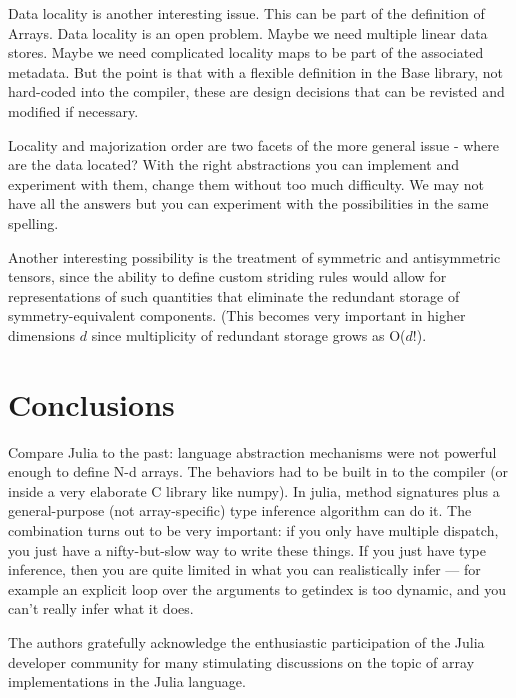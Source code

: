\documentclass[preprint]{sigplanconf}
\begin{document}
Data locality is another interesting issue. This can be part of the definition
of Arrays. Data locality is an open problem. Maybe we need multiple linear
data stores. Maybe we need complicated locality maps to be part of the
associated metadata. But the point is that with a flexible definition in the
Base library, not hard-coded into the compiler, these are design decisions
that can be revisted and modified if necessary.

Locality and majorization order are two facets of the more general issue -
where are the data located? With the right abstractions you can implement and
experiment with them, change them without too much difficulty. We may not have
all the answers but you can experiment with the possibilities in the same
spelling.

Another interesting possibility is the treatment of symmetric and
antisymmetric tensors, since the ability to define custom striding rules would
allow for representations of such quantities that eliminate the redundant
storage of symmetry-equivalent components. (This becomes very important in
higher dimensions $d$ since multiplicity of redundant storage grows as
O($d!$).

\section{Conclusions}

Compare Julia to the past: language abstraction mechanisms
were not powerful enough to define N-d arrays. The behaviors had to be
built in to the compiler (or inside a very elaborate C library like
numpy). In julia, method signatures plus a general-purpose (not
array-specific) type inference algorithm can do it. The combination
turns out to be very important: if you only have multiple dispatch,
you just have a nifty-but-slow way to write these things. If you just
have type inference, then you are quite limited in what you can
realistically infer --- for example an explicit loop over the
arguments to getindex is too dynamic, and you can't really infer what
it does.

%

\acks

The authors gratefully acknowledge the enthusiastic participation of the Julia
developer community for many stimulating discussions on the topic of array
implementations in the Julia language.
\end{document}
